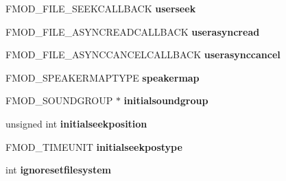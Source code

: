 \begin{DoxyCompactItemize}
\item 
F\+M\+O\+D\+\_\+\+F\+I\+L\+E\+\_\+\+S\+E\+E\+K\+C\+A\+L\+L\+B\+A\+CK {\bfseries userseek}\hypertarget{struct_f_m_o_d___c_r_e_a_t_e_s_o_u_n_d_e_x_i_n_f_o_a9063a97ac9de132f8ff2ba7048670e1c}{}\label{struct_f_m_o_d___c_r_e_a_t_e_s_o_u_n_d_e_x_i_n_f_o_a9063a97ac9de132f8ff2ba7048670e1c}

\item 
F\+M\+O\+D\+\_\+\+F\+I\+L\+E\+\_\+\+A\+S\+Y\+N\+C\+R\+E\+A\+D\+C\+A\+L\+L\+B\+A\+CK {\bfseries userasyncread}\hypertarget{struct_f_m_o_d___c_r_e_a_t_e_s_o_u_n_d_e_x_i_n_f_o_a4d0dd8153d5191e550b8a8ef6123d737}{}\label{struct_f_m_o_d___c_r_e_a_t_e_s_o_u_n_d_e_x_i_n_f_o_a4d0dd8153d5191e550b8a8ef6123d737}

\item 
F\+M\+O\+D\+\_\+\+F\+I\+L\+E\+\_\+\+A\+S\+Y\+N\+C\+C\+A\+N\+C\+E\+L\+C\+A\+L\+L\+B\+A\+CK {\bfseries userasynccancel}\hypertarget{struct_f_m_o_d___c_r_e_a_t_e_s_o_u_n_d_e_x_i_n_f_o_a6cf94db240477e76107573b5e4f69ed8}{}\label{struct_f_m_o_d___c_r_e_a_t_e_s_o_u_n_d_e_x_i_n_f_o_a6cf94db240477e76107573b5e4f69ed8}

\item 
F\+M\+O\+D\+\_\+\+S\+P\+E\+A\+K\+E\+R\+M\+A\+P\+T\+Y\+PE {\bfseries speakermap}\hypertarget{struct_f_m_o_d___c_r_e_a_t_e_s_o_u_n_d_e_x_i_n_f_o_a4a2100eaf35bb354cff5875811450006}{}\label{struct_f_m_o_d___c_r_e_a_t_e_s_o_u_n_d_e_x_i_n_f_o_a4a2100eaf35bb354cff5875811450006}

\item 
F\+M\+O\+D\+\_\+\+S\+O\+U\+N\+D\+G\+R\+O\+UP $\ast$ {\bfseries initialsoundgroup}\hypertarget{struct_f_m_o_d___c_r_e_a_t_e_s_o_u_n_d_e_x_i_n_f_o_a680f5786a4a73c4ce3efd244aab1aeba}{}\label{struct_f_m_o_d___c_r_e_a_t_e_s_o_u_n_d_e_x_i_n_f_o_a680f5786a4a73c4ce3efd244aab1aeba}

\item 
unsigned int {\bfseries initialseekposition}\hypertarget{struct_f_m_o_d___c_r_e_a_t_e_s_o_u_n_d_e_x_i_n_f_o_abd2577182ac908d6af88d4610470e68c}{}\label{struct_f_m_o_d___c_r_e_a_t_e_s_o_u_n_d_e_x_i_n_f_o_abd2577182ac908d6af88d4610470e68c}

\item 
F\+M\+O\+D\+\_\+\+T\+I\+M\+E\+U\+N\+IT {\bfseries initialseekpostype}\hypertarget{struct_f_m_o_d___c_r_e_a_t_e_s_o_u_n_d_e_x_i_n_f_o_acb1b8eee3ee0a85e91dbb7a88a74d574}{}\label{struct_f_m_o_d___c_r_e_a_t_e_s_o_u_n_d_e_x_i_n_f_o_acb1b8eee3ee0a85e91dbb7a88a74d574}

\item 
int {\bfseries ignoresetfilesystem}\hypertarget{struct_f_m_o_d___c_r_e_a_t_e_s_o_u_n_d_e_x_i_n_f_o_a6bbfa77595d2a222ab5b51c8163015f9}{}\label{struct_f_m_o_d___c_r_e_a_t_e_s_o_u_n_d_e_x_i_n_f_o_a6bbfa77595d2a222ab5b51c8163015f9}


\end{DoxyCompactItemize}

